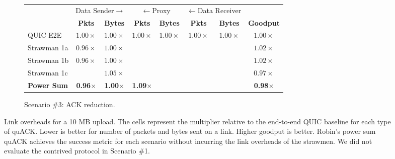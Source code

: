 \begin{figure}[h]
\begin{subfigure}{\columnwidth}
  \setlength{\tabcolsep}{2pt}
  \footnotesize
  \centering
  \begin{tabular}{lccccccc}
    \toprule
    & \multicolumn{2}{c}{Data Sender$\rightarrow$} & \multicolumn{2}{c}{$\leftarrow$Proxy} & \multicolumn{2}{c}{$\leftarrow$Data Receiver} & \\
    & \bf Pkts & \bf Bytes & \bf Pkts & \bf Bytes & \bf Pkts & \bf Bytes & \bf Goodput \\
    \midrule
    QUIC E2E & $1.00\times$ & $1.00\times$ & $1.00\times$ & $1.00\times$ & $1.00\times$ & $1.00\times$ & $1.00\times$ \\
    Strawman 1a & $0.96\times$ & $1.00\times$ & \cellcolor{LightRed}{$9.94\times$} & \cellcolor{LighterRed}{$4.99\times$} & \cellcolor{LightGreen}{$0.04\times$} & \cellcolor{LightGreen}{$0.08\times$} & $1.02\times$ \\
    Strawman 1b & $0.96\times$ & $1.00\times$ & \cellcolor{LightRed}{$9.95\times$} & \cellcolor{LightRed}{$7.13\times$}      & \cellcolor{LightGreen}{$0.04\times$} & \cellcolor{LightGreen}{$0.08\times$} & $1.02\times$ \\
    Strawman 1c & \cellcolor{LightestRed}{$1.91\times$} & $1.05\times$ & \cellcolor{LightRed}{$9.73\times$} & \cellcolor{LightRed}{$7.41\times$}      & \cellcolor{LightGreen}{$0.04\times$} & \cellcolor{LightGreen}{$0.08\times$} & $0.97\times$ \\
    \bf \textcolor{black!50!blue}{Power Sum}    & \textcolor{black!50!blue}{\bf 0.96$\times$} & \textcolor{black!50!blue}{\bf 1.00$\times$} & \textcolor{black!50!blue}{\bf 1.09$\times$} & \cellcolor{LighterRed}{\textcolor{black!50!blue}{\bf 2.56$\times$}} & \cellcolor{LightGreen}{\textcolor{black!50!blue}{\bf 0.04$\times$}} & \cellcolor{LightGreen}{\textcolor{black!50!blue}{\bf 0.08$\times$}} & \textcolor{black!50!blue}{\bf 0.98$\times$} \\
    \bottomrule
  \end{tabular}
  \caption{Scenario \#3: ACK reduction.}
  \label{tab:packet-overhead:ackr}
\end{subfigure}
\caption{Link overheads for a 10 MB upload. The cells represent the multiplier
relative to the end-to-end QUIC baseline for each type of quACK\@.
Lower is better for number of packets and bytes sent on a link.
Higher goodput is better. Robin's power sum quACK achieves the success metric
for each scenario without incurring the link overheads of the strawmen.
We did not evaluate the contrived protocol in Scenario \#1.
}
\label{tab:packet-overhead}
\end{figure}
